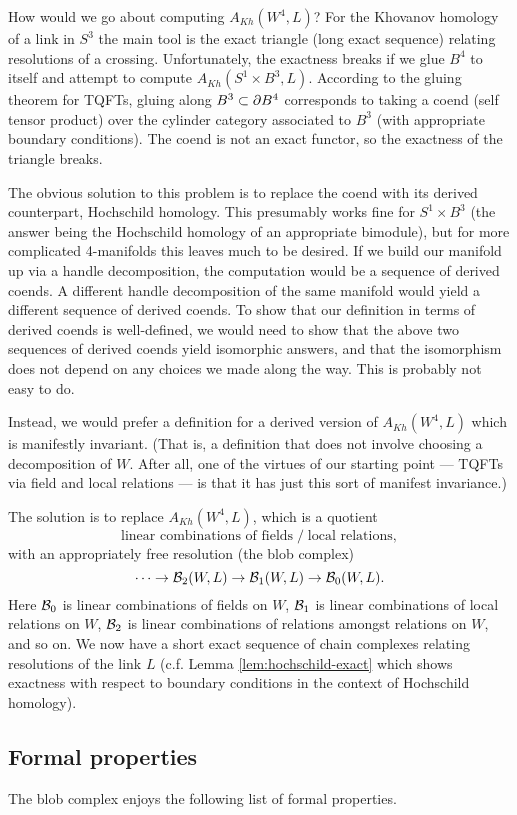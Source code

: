 How would we go about computing $A_{Kh}(W^4, L)$?
For the Khovanov homology of a link in $S^3$ the main tool is the exact triangle (long exact sequence)
relating resolutions of a crossing.
Unfortunately, the exactness breaks if we glue $B^4$ to itself and attempt
to compute $A_{Kh}(S^1\times B^3, L)$.
According to the gluing theorem for TQFTs, gluing along $B^3 \subset \partial B^4$
corresponds to taking a coend (self tensor product) over the cylinder category
associated to $B^3$ (with appropriate boundary conditions).
The coend is not an exact functor, so the exactness of the triangle breaks.

The obvious solution to this problem is to replace the coend with its derived counterpart, 
Hochschild homology.
This presumably works fine for $S^1\times B^3$ (the answer being the Hochschild homology
of an appropriate bimodule), but for more complicated 4-manifolds this leaves much to be desired.
If we build our manifold up via a handle decomposition, the computation
would be a sequence of derived coends.
A different handle decomposition of the same manifold would yield a different
sequence of derived coends.
To show that our definition in terms of derived coends is well-defined, we
would need to show that the above two sequences of derived coends yield 
isomorphic answers, and that the isomorphism does not depend on any
choices we made along the way.
This is probably not easy to do.

Instead, we would prefer a definition for a derived version of $A_{Kh}(W^4, L)$
which is manifestly invariant.
(That is, a definition that does not
involve choosing a decomposition of $W$.
After all, one of the virtues of our starting point --- TQFTs via field and local relations ---
is that it has just this sort of manifest invariance.)

The solution is to replace $A_{Kh}(W^4, L)$, which is a quotient
\[
 \text{linear combinations of fields} \;\big/\; \text{local relations} ,
\]
with an appropriately free resolution (the blob complex)
\[
	\cdots\to {\mathcal B}_2(W, L) \to {\mathcal B}_1(W, L) \to {\mathcal B}_0(W, L) .
\]
Here ${\mathcal B}_0$ is linear combinations of fields on $W$,
${\mathcal B}_1$ is linear combinations of local relations on $W$,
${\mathcal B}_2$ is linear combinations of relations amongst relations on $W$,
and so on. We now have a short exact sequence of chain complexes relating resolutions of the link $L$ 
(c.f. Lemma \ref{lem:hochschild-exact} which shows exactness 
with respect to boundary conditions in the context of Hochschild homology).


\subsection{Formal properties}
\label{sec:properties}
The blob complex enjoys the following list of formal properties.

